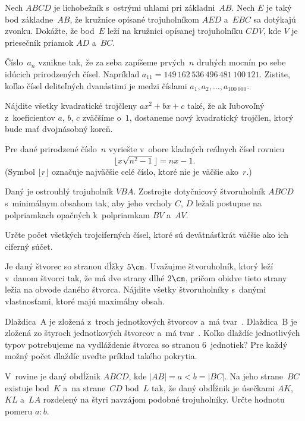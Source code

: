 {%
Nech $ABCD$ je lichobežník s~ostrými uhlami pri základni~$AB$. Nech $E$ je
taký bod základne~$AB$, že kružnice opísané trojuholníkom $AED$ a~$EBC$ sa dotýkajú
zvonku. Dokážte, že bod~$E$ leží na kružnici opísanej trojuholníku $CDV$,
kde $V$ je priesečník priamok $AD$ a~$BC$.}

{%
Číslo~$a_n$ vznikne tak, že za seba zapíšeme prvých~$n$ druhých
mocnín po sebe idúcich prirodzených čísel. Napríklad
$a_{11}=149\,162\,536\,496\,481\,100\,121$. Zistite, koľko čísel
deliteľných dvanástimi je medzi číslami $a_1,a_2,\dots,a_{100\,000}$.}

{%
Nájdite všetky kvadratické trojčleny
$ax^2  + bx + c$
také, že ak ľubovoľný z~koeficientov $a$, $b$, $c$ zväčšíme
o~$1$, dostaneme nový kvadratický trojčlen, ktorý bude mať
dvojnásobný koreň.}

{%
Pre dané prirodzené číslo~$n$ vyriešte
v~obore kladných reálnych čísel rovnicu
$$
\bigl\lfloor{x\sqrt{n^2-1}}\bigr\rfloor=nx-1.
$$
(Symbol $\lfloor r\rfloor$ označuje najväčšie
celé číslo, ktoré nie je väčšie ako~$r$.)}

{%
Daný je ostrouhlý trojuholník $VBA$. Zostrojte dotyčnicový štvoruholník $ABCD$
s~minimálnym obsahom tak, aby jeho vrcholy $C$, $D$ ležali postupne na polpriamkach
opačných k~polpriamkam $BV$ a~$AV$.}

{%
Určte počet všetkých trojciferných čísel, ktoré sú devätnásťkrát
väčšie ako ich ciferný súčet.}

{%
Je daný štvorec so stranou dĺžky $5\cm$. Uvažujme štvoruholník, ktorý
leží v~danom štvorci tak, že má dve strany dlhé $2\cm$, pričom obidve tieto
strany ležia na obvode daného štvorca. Nájdite všetky štvoruholníky s~danými
vlastnosťami, ktoré majú maximálny obsah.}

{%
Dlaždica~A je zložená z~troch jednotkových štvorcov a~má tvar~.
Dlaždica~B je zložená zo štyroch jednotkových štvorcov a~má tvar~.
Koľko dlaždíc jednotlivých typov potrebujeme na vydláždenie
štvorca so stranou 6~jednotiek? Pre každý možný počet dlaždíc
uveďte príklad takého pokrytia.}

{%
V~rovine je daný obdĺžnik $ABCD$, kde $|AB|=a<b=|BC|$. Na jeho
strane~$BC$ existuje bod~$K$ a~na strane~$CD$ bod~$L$ tak, že
daný obdĺžnik je úsečkami $AK$, $KL$ a~$LA$ rozdelený na štyri
navzájom podobné trojuholníky. Určte hodnotu pomeru $a:b$.}

